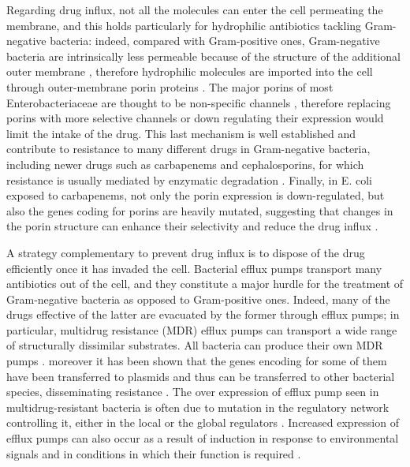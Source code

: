Regarding drug influx, not all the molecules can enter the cell permeating the membrane, and this holds particularly for hydrophilic antibiotics tackling Gram-negative bacteria: indeed, compared with Gram-positive ones, Gram-negative bacteria are intrinsically less permeable because of the structure of the additional outer membrane \cite{Delcour2009}, therefore hydrophilic molecules are imported into the cell through outer-membrane porin proteins \cite{Vargiu2012,Kojima2013}.
%
The major porins of most Enterobacteriaceae are thought to be non-specific channels \cite{Tran2013}, therefore replacing porins with more selective channels or down regulating their expression would limit the intake of the drug. This last mechanism is well established and contribute to resistance to many different drugs in Gram-negative bacteria, including newer drugs such as carbapenems and cephalosporins, for which resistance is usually mediated by enzymatic degradation \cite{Tamber2003,Baroud2013,Lavigne2013,Poulou2013,Wozniak2012}.
Finally, in E. coli exposed to carbapenems, not only the porin expression is down-regulated, but also the genes coding for porins are heavily mutated, suggesting that changes in the porin structure can enhance their selectivity and reduce the drug influx \cite{Lavigne2013,Novais2012,Tangden2013}.

A strategy complementary to prevent drug influx is to dispose of the drug efficiently once it has invaded the cell. Bacterial efflux pumps transport many antibiotics out of the cell, and they constitute a major hurdle for the treatment of Gram-negative bacteria as opposed to Gram-positive ones. Indeed, many of the drugs effective of the latter are evacuated by the former through efflux pumps; in particular, multidrug resistance (MDR) efflux pumps can transport a wide range of structurally dissimilar substrates.
%
All bacteria can produce their own MDR pumps \cite{Floyd2010,Hu2012,Kim2013,Ogawa2012}. moreover it has been shown that the genes encoding for some of them have been transferred to plasmids and thus can be transferred to other bacterial species, disseminating resistance \cite{Dolejska2013}.
%
The over expression of efflux pump seen in multidrug-resistant bacteria is often due to mutation in the regulatory network controlling it, either in the local or the global regulators \cite{Abouzeed2008}.
%
Increased expression of efflux pumps can also occur as a result of induction in response to environmental signals and in conditions in which their function is required \cite{Baucheron2014,Nikaido2011,Hirakawa2004}.


